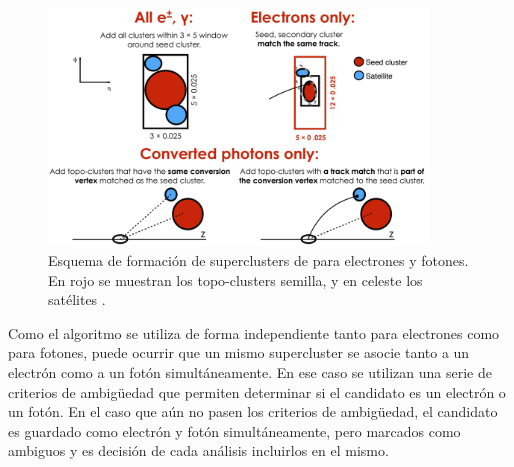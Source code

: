  \begin{figure}
 \centering
   \includegraphics[width=0.9\textwidth]{images/objects/superclusters_sat.png}
   \caption{Esquema de formación de superclusters de para electrones y fotones. En rojo se muestran los topo-clusters semilla, y en celeste los satélites \cite{EGAM-2018-01}.}
   \label{fig:superclusters_sat}
 \end{figure}

Como el algoritmo se utiliza de forma independiente tanto para electrones como para fotones, puede ocurrir que un mismo supercluster se asocie tanto a un electrón como a un fotón simultáneamente. En ese caso se utilizan una serie de criterios de ambigüedad que permiten determinar si el candidato es un electrón o un fotón. En el caso que aún no pasen los criterios de ambigüedad, el candidato es guardado como electrón y fotón simultáneamente, pero marcados como ambiguos y es decisión de cada análisis incluirlos en el mismo. 




